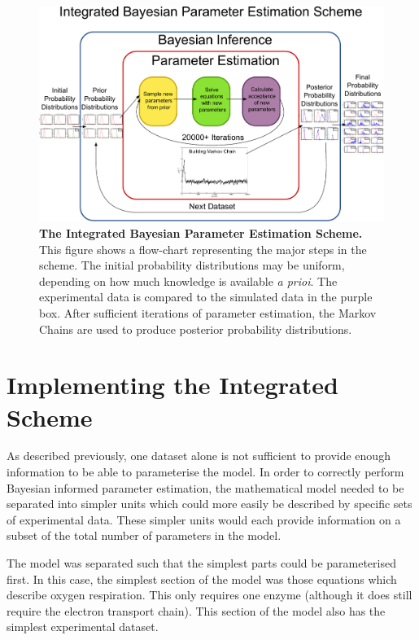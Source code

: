 \begin{figure}
 \centering
 \includegraphics[width=20.4cm]{./03-parameterestimationmethodologies/data/paramest.pdf}
 \caption[{The Integrated Bayesian Parameter Estimation Scheme}]{{\bf The Integrated Bayesian Parameter Estimation Scheme.} This figure shows a flow-chart representing the major steps in the scheme. The initial probability distributions may be uniform, depending on how much knowledge is available \textit{a prioi}. The experimental data is compared to the simulated data in the purple box. After sufficient iterations of parameter estimation, the Markov Chains are used to produce posterior probability distributions.
 \label{fig:intscheme}}
\end{figure}

\section{Implementing the Integrated Scheme}
As described previously, one dataset alone is not sufficient to provide enough information to be able to parameterise the model. In order to correctly perform Bayesian informed parameter estimation, the mathematical model needed to be separated into simpler units which could more easily be described by specific sets of experimental data. These simpler units would each provide information on a subset of the total number of parameters in the model.

The model was separated such that the simplest parts could be parameterised first. In this case, the simplest section of the model was those equations which describe oxygen respiration. This only requires one enzyme (although it does still require the electron transport chain). This section of the model also has the simplest experimental dataset.

